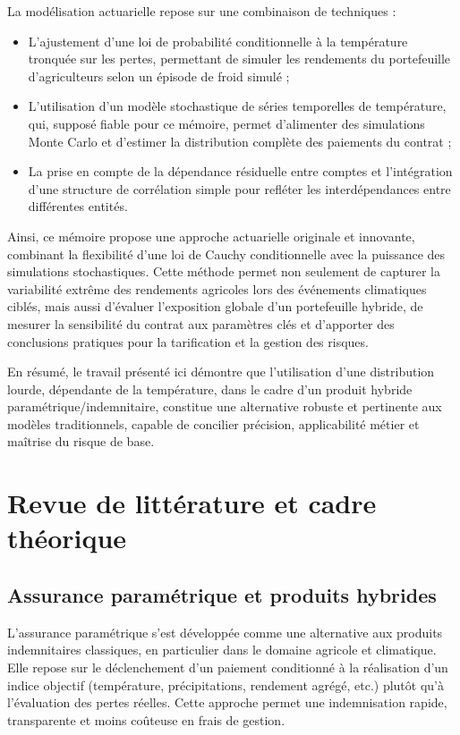 \documentclass[11pt,a4paper,openright,twoside]{report}
\begin{document}
La modélisation actuarielle repose sur une combinaison de techniques     :
\begin{itemize}
\item L’ajustement d’une loi de probabilité conditionnelle à la température tronquée sur les pertes, permettant de simuler les rendements du portefeuille d'agriculteurs selon un épisode de froid simulé ;

\item L’utilisation d’un modèle stochastique de séries temporelles de température, qui, supposé fiable pour ce mémoire, permet d’alimenter des simulations Monte Carlo et d’estimer la distribution complète des paiements du contrat ;

\item La prise en compte de la dépendance résiduelle entre comptes et l’intégration d’une structure de corrélation simple pour refléter les interdépendances entre différentes entités.

\end{itemize}

Ainsi, ce mémoire propose une approche actuarielle originale et innovante, combinant la flexibilité d’une loi de Cauchy conditionnelle avec la puissance des simulations stochastiques. Cette méthode permet non seulement de capturer la variabilité extrême des rendements agricoles lors des événements climatiques ciblés, mais aussi d’évaluer l’exposition globale d’un portefeuille hybride, de mesurer la sensibilité du contrat aux paramètres clés et d’apporter des conclusions pratiques pour la tarification et la gestion des risques.

En résumé, le travail présenté ici démontre que l’utilisation d’une distribution lourde, dépendante de la température, dans le cadre d’un produit hybride paramétrique/indemnitaire, constitue une alternative robuste et pertinente aux modèles traditionnels, capable de concilier précision, applicabilité métier et maîtrise du risque de base.

\chapter{Revue de littérature et cadre théorique}

\section{Assurance paramétrique et produits hybrides}
L’assurance paramétrique s’est développée comme une alternative aux produits indemnitaires classiques, en particulier dans le domaine agricole et climatique. Elle repose sur le déclenchement d’un paiement conditionné à la réalisation d’un indice objectif (température, précipitations, rendement agrégé, etc.) plutôt qu’à l’évaluation des pertes réelles. Cette approche permet une indemnisation rapide, transparente et moins coûteuse en frais de gestion. 
\end{document}
